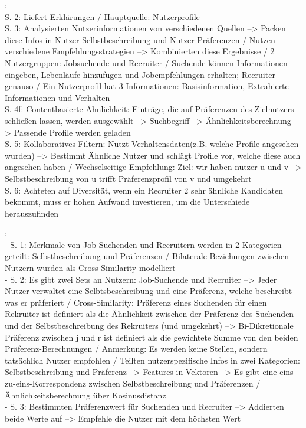 \textcite{hong:2013b}:\\
S. 2: Liefert Erklärungen / Hauptquelle: Nutzerprofile \\
S. 3: Analysierten Nutzerinformationen von verschiedenen Quellen --> Packen diese Infos in Nutzer Selbstbeschreibung und Nutzer Präferenzen / Nutzen verschiedene Empfehlungsstrategien --> Kombinierten diese Ergebnisse / 2 Nutzergruppen: Jobsuchende und Recruiter / Suchende können Informationen eingeben, Lebenläufe hinzufügen und Jobempfehlungen erhalten; Recruiter genauso / Ein Nutzerprofil hat 3 Informationen: Basisinformation, Extrahierte Informationen und Verhalten\\
S. 4f: Contentbasierte Ähnlichkeit: Einträge, die auf Präferenzen des Zielnutzers schließen lassen, werden ausgewählt --> Suchbegriff --> Ähnlichkeitsberechnung --> Passende Profile werden geladen\\
S. 5: Kollaboratives Filtern: Nutzt Verhaltensdaten(z.B. welche Profile angesehen wurden) --> Bestimmt Ähnliche Nutzer und schlägt Profile vor, welche diese auch angesehen haben / Wechselseitige Empfehlung: Ziel: wir haben nutzer u und v --> Selbstbeschreibung von u trifft Präferenzprofil von v und umgekehrt\\
S. 6: Achteten auf Diversität, wenn ein Recruiter 2 sehr ähnliche Kandidaten bekommt, muss er hohen Aufwand investieren, um die Unterschiede herauszufinden

\textcite{wenxing:2015}:\\
- S. 1: Merkmale von Job-Suchenden und Recruitern werden in 2 Kategorien geteilt: Selbstbeschreibung und Präferenzen / Bilaterale Beziehungen zwischen Nutzern wurden als Cross-Similarity modelliert\\
- S. 2: Es gibt zwei Sets an Nutzern: Job-Suchende und Recruiter --> Jeder Nutzer verwaltet eine Selbtsbeschreibung und eine Präferenz, welche beschreibt was er präferiert / Cross-Similarity: Präferenz eines Suchenden für einen Rekruiter ist definiert als die Ähnlichkeit zwischen der Präferenz des Suchenden und der Selbstbeschreibung des Rekruiters (und umgekehrt) --> Bi-Dikretionale Präferenz zwischen j und r ist definiert als die gewichtete Summe von den beiden Präferenz-Berechnungen / Anmerkung: Es werden keine Stellen, sondern tatsächlich Nutzer empfohlen / Teilten nutzerspezifische Infos in zwei Kategorien: Selbstbeschreibung und Präferenz --> Features in Vektoren --> Es gibt eine eins-zu-eins-Korrespondenz zwischen Selbstbeschreibung und Präferenzen / Ähnlichkeitsberechnung über Kosinusdistanz\\
- S. 3: Bestimmten Präferenzwert für Suchenden und Recruiter --> Addierten beide Werte auf --> Empfehle die Nutzer mit dem höchsten Wert

